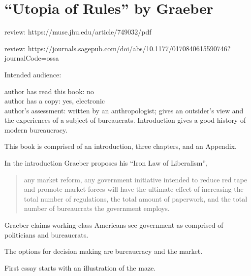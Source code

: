 \section{``Utopia of Rules'' by Graeber\label{review:graeber_utopia}}

\cite{2015_Graeber}

review: https://muse.jhu.edu/article/749032/pdf

review: https://journals.sagepub.com/doi/abs/10.1177/0170840615590746?journalCode=ossa


Intended audience:

author has read this book: no\\
author has a copy: yes, electronic\\
author's assessment: written by an anthropologist; gives an outsider's view and the experiences of a subject of bureaucrats. Introduction gives a good history of modern bureaucracy.


This book is comprised of an introduction, three chapters, and an Appendix. 

In the introduction Graeber proposes his ``Iron Law of Liberalism'',
\begin{quote}
    any market reform, any government initiative intended to reduce red tape and promote market forces will have the ultimate effect of increasing the total number of regulations, the total amount of paperwork, and the total number of bureaucrats the government employs.
\end{quote}

Graeber claims working-class Americans see government as comprised of politicians and bureaucrats.

The options for decision making are bureaucracy and the market.


First essay starts with an illustration of the maze.